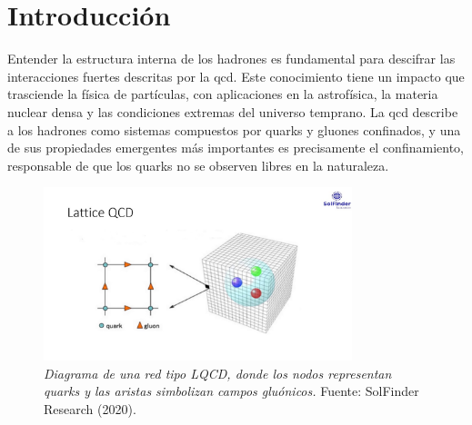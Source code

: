 \chapter*{Introducción}

\pagestyle{fancy}
\fancyhf{} %

Entender la estructura interna de los hadrones es fundamental para descifrar las interacciones fuertes descritas por la \gls{qcd}. Este conocimiento tiene un impacto que trasciende la física de partículas, con aplicaciones en la astrofísica, la materia nuclear densa y las condiciones extremas del universo temprano. La \gls{qcd} describe a los hadrones como sistemas compuestos por quarks y gluones confinados, y una de sus propiedades emergentes más importantes es precisamente el confinamiento, responsable de que los quarks no se observen libres en la naturaleza.


\begin{figure}[h]
    \centering
    \includegraphics[width=0.8\textwidth]{./Images/LQCD.jpg}
    \caption[Red LQCD]{\emph{Diagrama de una red tipo LQCD, donde los nodos representan quarks y las aristas simbolizan campos gluónicos.} Fuente: SolFinder Research (2020).}
    \label{fig:LQCD }
\end{figure}

